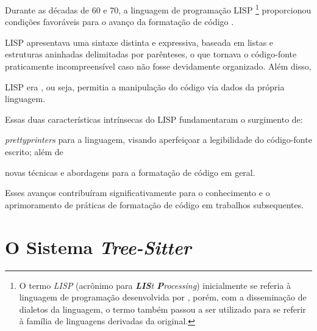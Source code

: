 \documentclass
  [11pt, a4paper, english, openright, sumario = tradicional, twoside, brazil]
  {abntex2}
\begin{document}
  Durante as décadas de 60 e 70, a linguagem de programação LISP%
  \footnote
    {O termo \textit{LISP} (acrônimo para
     \textit{\textbf{LIS}t \textbf{P}rocessing}) inicialmente se referia à
     linguagem de programação desenvolvida por
     \textcite{mccarthy-1960-recursive}, porém, com a disseminação de dialetos
     da linguagem, o termo também passou a ser utilizado para se referir à
     família de linguagens derivadas da original.}
  proporcionou condições favoráveis para o avanço da formatação de código
  \cite[2]{yelland-2015-rfmt}.
  \begin{inparaenum}
    \item LISP apresentava uma sintaxe distinta e expressiva, baseada em listas
          e estruturas aninhadas delimitadas por parênteses, o que tornava o
          código-fonte praticamente incompreensível caso não fosse devidamente
          organizado. Além disso,
    \item LISP era , ou seja, permitia a manipulação do
          código via dados da própria linguagem.
  \end{inparaenum}
  Essas duas características intrínsecas do LISP fundamentaram o surgimento de:
  \begin{inparaenum}
    \item \textit{prettyprinters} para a linguagem, visando aperfeiçoar a
          legibilidade do código-fonte escrito; além de
    \item novas técnicas e abordagens para a formatação de código em geral.
  \end{inparaenum}
  Esses avanços contribuíram significativamente para o conhecimento e o
  aprimoramento de práticas de formatação de código em trabalhos subsequentes.


  \chapter{O Sistema \textit{Tree-Sitter}}
\end{document}
